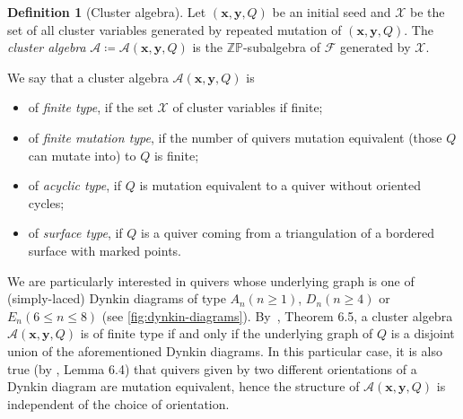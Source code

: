 \documentclass[a4paper,oneside,svgnames,draft]{amsart}
\theoremstyle{plain}
\theoremstyle{definition}
\newtheorem{definition}[theorem]{Definition}
\begin{document}
 \begin{definition}[Cluster algebra]
  Let $(\mathbf{x},\mathbf{y},Q)$ be an initial seed and $\mathcal{X}$ be the
  set of all cluster variables generated by repeated mutation of
  $(\mathbf{x},\mathbf{y},Q)$. The \emph{cluster algebra} $\mathcal{A} \coloneqq
  \mathcal{A}(\mathbf{x},\mathbf{y},Q)$ is the $\mathbb{Z}\mathbb{P}$-subalgebra
  of $\mathcal{F}$ generated by $\mathcal{X}$.

  We say that a cluster algebra $\mathcal{A}(\mathbf{x},\mathbf{y},Q)$ is
  \begin{itemize}
   \item of \emph{finite type}, if the set $\mathcal{X}$ of cluster variables if
    finite;
   \item of \emph{finite mutation type}, if the number of quivers mutation
    equivalent (those $Q$ can mutate into) to $Q$ is finite;
   \item of \emph{acyclic type}, if $Q$ is mutation equivalent to a quiver
    without oriented cycles;
   \item of \emph{surface type}, if $Q$ is a quiver coming from a triangulation
    of a bordered surface with marked points.
  \end{itemize}
 \end{definition}

 We are particularly interested in quivers whose underlying graph is one of
 (simp\-ly-laced) Dynkin diagrams of type $A_n (n \geq 1)$, $D_n (n \geq 4)$ or
 $E_n (6 \leq n \leq 8)$ (see \cref{fig:dynkin-diagrams}). By~\cite{fst}, Theorem
 6.5, a cluster algebra $\mathcal{A}(\mathbf{x},\mathbf{y},Q)$ is of finite type
 if and only if the underlying graph of $Q$ is a disjoint union of the
 aforementioned Dynkin diagrams. In this particular case, it is also true (by
 \cite{fst}, Lemma 6.4) that quivers given by two different orientations of a
 Dynkin diagram are mutation equivalent, hence the structure of
 $\mathcal{A}(\mathbf{x},\mathbf{y},Q)$ is independent of the choice of
 orientation.
\end{document}
